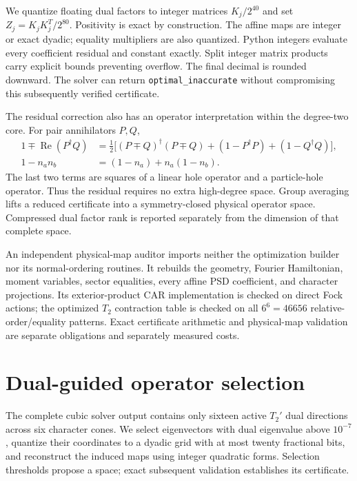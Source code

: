 \documentclass[11pt]{article}
\begin{document}
We quantize floating dual factors to integer matrices $K_j/2^{40}$ and set $Z_j=K_jK_j^T/2^{80}$. Positivity is exact by construction. The affine maps are integer or exact dyadic; equality multipliers are also quantized. Python integers evaluate every coefficient residual and constant exactly. Split integer matrix products carry explicit bounds preventing overflow. The final decimal is rounded downward. The solver can return \texttt{optimal\_inaccurate} without compromising this subsequently verified certificate.

The residual correction also has an operator interpretation within the degree-two core. For pair annihilators $P,Q$,
\begin{align}
 1\mp\operatorname{Re}(P^\dagger Q)
 &=\tfrac12\big[(P\mp Q)^\dagger(P\mp Q)+(1-P^\dagger P)+(1-Q^\dagger Q)\big],\\
 1-n_an_b&=(1-n_a)+n_a(1-n_b).
\end{align}
The last two terms are squares of a linear hole operator and a particle-hole operator. Thus the residual requires no extra high-degree space. Group averaging lifts a reduced certificate into a symmetry-closed physical operator space. Compressed dual factor rank is reported separately from the dimension of that complete space.

An independent physical-map auditor imports neither the optimization builder nor its normal-ordering routines. It rebuilds the geometry, Fourier Hamiltonian, moment variables, sector equalities, every affine PSD coefficient, and character projections. Its exterior-product CAR implementation is checked on direct Fock actions; the optimized $T_2$ contraction table is checked on all $6^6=46656$ relative-order/equality patterns. Exact certificate arithmetic and physical-map validation are separate obligations and separately measured costs.

\section{Dual-guided operator selection}
The complete cubic solver output contains only sixteen active $T_2'$ dual directions across six character cones. We select eigenvectors with dual eigenvalue above $10^{-7}$, quantize their coordinates to a dyadic grid with at most twenty fractional bits, and reconstruct the induced maps using integer quadratic forms. Selection thresholds propose a space; exact subsequent validation establishes its certificate.
\end{document}

